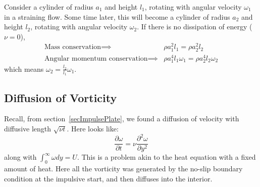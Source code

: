 \documentclass[../Main.tex]{subfiles}
\begin{document}
Consider a cylinder of radius $a_1$ and height $l_1$, rotating with angular velocity $\omega_1$ in a straining flow. Some time later, this will become a cylinder of radius $a_2$ and height $l_2$, rotating with angular velocity $\omega_2$. If there is no dissipation of energy ($\nu = 0$),
\begin{align*}
    \text{Mass conservation} \implies& \rho a_1^2 l_1 = \rho a_2^2 l_2 \\
    \text{Angular momentum conservation} \implies& \rho a_1^4 l_1 \omega_1 = \rho a_2^4 l_2\omega_2
\end{align*}
which means $\omega_2 = \frac{l_2}{l_1}\omega_1$.
\subsection{Diffusion of Vorticity}
Recall, from section~\ref{secImpulsePlate}, we found a diffusion of velocity with diffusive length $\sqrt{\nu t}$. Here  looks like:
\begin{equation*}
    \frac{\partial \omega}{\partial t} = \nu \frac{\partial^{2}\omega}{\partial y^{2}}
\end{equation*}
along with $\int_{0}^{\infty} \omega dy = U$. This is a problem akin to the heat equation with a fixed amount of heat. Here all the vorticity was generated by the no-slip boundary condition at the impulsive start, and then diffuses into the interior.
\end{document}
